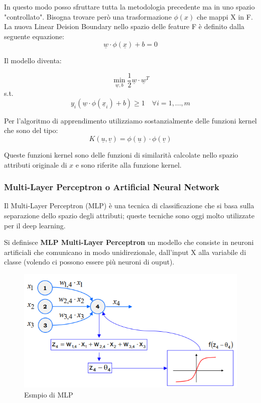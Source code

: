 In questo modo posso sfruttare tutta la metodologia precedente ma in uno spazio "controllato". Bisogna trovare però una trasformazione $\phi(x)$ che mappi X in F.
La nuova Linear Deision Boundary nello spazio delle feature F è definito dalla seguente equazione: 
\[\underline{w} \cdot \phi(\underline{x}) + b = 0\]

Il modello diventa:

\[ \min_{\underline{w},b} \frac{1}{2}\underline{w} \cdot \underline{w}^T \]
\qquad s.t.
\[ y_i (\underline{w} \cdot \phi(\underline{x}_i) + b) \ge 1 \quad \forall i = 1, ..., m\]

Per l'algoritmo di apprendimento utilizziamo sostanzialmente delle funzioni kernel che sono del tipo:
 \[K(\underline{u}, \underline{v}) = \phi(\underline{u}) \cdot \phi(\underline{v})\]
 
 Queste funzioni kernel sono delle funzioni di similarità calcolate nello spazio attributi originale di $x$ e sono riferite alla funzione kernel.

\subsubsection{Multi-Layer Perceptron o Artificial Neural Network}
Il Multi-Layer Perceptron (MLP) è una tecnica di classificazione che si basa sulla separazione dello spazio degli attributi; queste tecniche sono oggi molto utilizzate per il deep learning.
\begin{defn}
 	Si definisce \textbf{MLP Multi-Layer Perceptron} un modello che consiste in neuroni artificiali che comunicano in modo unidirezionale, dall'input X alla variabile di classe (volendo ci possono essere più neuroni di ouput).
\end{defn}

\begin{figure}[H]
	\hspace{-0.5cm}
	\includegraphics[height=0.45 \linewidth]{classification/pict/mlp.png}
	\caption{Esmpio di MLP}
\end{figure}

